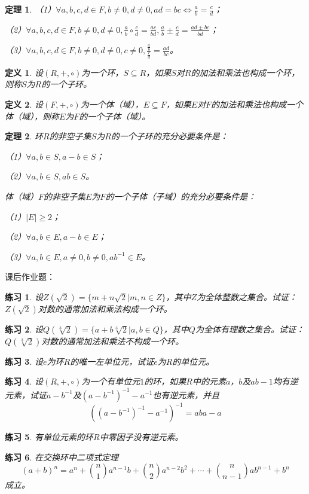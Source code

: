 \documentclass{article}
\newtheorem{Def}{定义}
\newtheorem{Thm}{定理}
\newtheorem{Exercise}{练习}
\begin{document}
\begin{CJK*}{UTF8}{gbsn}
\begin{Thm}
  （1）$\forall a,b,c,d\in F, b\neq 0, d\neq 0, ad=bc \Leftrightarrow \frac{a}{b} = \frac{c}{d}$；

  （2）$\forall a,b,c,d\in F, b\neq 0, d\neq 0, \frac{a}{b}\circ \frac{c}{d}=\frac{ac}{bd}, \frac{a}{b}\pm\frac{c}{d}=\frac{ad\pm bc}{bd}$；

  （3）$\forall a,b,c,d\in F, b\neq 0, d\neq 0,c\neq 0, \frac{\frac{a}{b}}{\frac{c}{d}}=\frac{ad}{bc}$。
\end{Thm}

\begin{Def}
  设$(R,+,\circ)$为一个环，$S\subseteq R$，如果$S$对$R$的加法和乘法也构成一个环，则称$S$为$R$的一个子环。
\end{Def}

\begin{Def}
  设$(F,+,\circ)$为一个体（域），$E\subseteq F$，如果$E$对$F$的加法和乘法也构成一个体（域），则称$E$为$F$的一个子体（域）。
\end{Def}
\begin{Thm}
  环$R$的非空子集$S$为$R$的一个子环的充分必要条件是：

  （1）$\forall a,b\in S, a-b\in S$；

  （2）$\forall a,b\in S, ab\in S$。

  体（域）$F$的非空子集$E$为$F$的一个子体（子域）的充分必要条件是：

  （1）$|E|\geq 2$；

  （2）$\forall a,b \in E, a-b\in E$；

  （3）$\forall a,b \in E, a\neq 0, b\neq 0, ab^{-1}\in E$。
\end{Thm}
课后作业题：
\begin{Exercise}
  设$Z(\sqrt{2})=\{m+n\sqrt{2}|m,n\in Z\}$，其中$Z$为全体整数之集合。试证：$Z(\sqrt{2})$对数的通常加法和乘法构成一个环。
\end{Exercise}
\begin{Exercise}
  设$Q(\sqrt[3]{2})=\{a+b\sqrt[3]{2}|a,b\in Q\}$，其中$Q$为全体有理数之集合。试证：$Q(\sqrt[3]{2})$对数的通常加法和乘法不构成一个环。
\end{Exercise}
\begin{Exercise}
设$e$为环$R$的唯一左单位元，试证$e$为$R$的单位元。
\end{Exercise}

\begin{Exercise}
设$(R,+,\circ)$为一个有单位元$1$的环，如果$R$中的元素$a$，$b$及$ab-1$均有逆元素，试证$a-b^{-1}$及$(a-b^{-1})^{-1}-a^{-1}$也有逆元素，并且
\[((a-b^{-1})^{-1}-a^{-1})^{-1}=aba-a\]
\end{Exercise}
\begin{Exercise}
  有单位元素的环$R$中零因子没有逆元素。
\end{Exercise}
\begin{Exercise}
  在交换环中二项式定理
\[(a+b)^n=a^n+\binom{n}{1}a^{n-1}b+\binom{n}{2}a^{n-2}b^2+\cdots+\binom{n}{n-1}ab^{n-1}+b^n\]
  成立。
\end{Exercise}
\end{CJK*}
\end{document}
